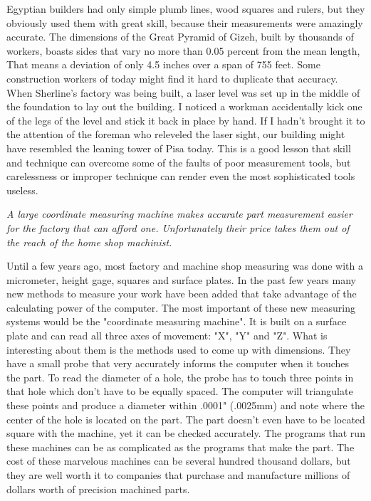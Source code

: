 Egyptian builders had only simple plumb lines, wood squares and rulers, but they
obviously used them with great skill, because their measurements were amazingly
accurate. The dimensions of the Great Pyramid of Gizeh, built by thousands of
workers, boasts sides that vary no more than 0.05 percent from the mean length,
That means a deviation of only 4.5 inches over a span of 755 feet. Some
construction workers of today might find it hard to duplicate that accuracy.
When Sherline's factory was being built, a laser level was set up in the middle
of the foundation to lay out the building. I noticed a workman accidentally kick
one of the legs of the level and stick it back in place by hand. If I hadn't
brought it to the attention of the foreman who releveled the laser sight, our
building might have resembled the leaning tower of Pisa today. This is a good
lesson that skill and technique can overcome some of the faults of poor
measurement tools, but carelessness or improper technique can render even the
most sophisticated tools useless.

\bigskip
\textit{A large coordinate measuring machine makes accurate part measurement
easier for the factory that can afford one. Unfortunately their price takes them
out of the reach of the home shop machinist.}
\bigskip


Until a few years ago, most factory and machine shop measuring was done with a
micrometer, height gage, squares and surface plates. In the past few years many
new methods to measure your work have been added that take advantage of the
calculating power of the computer. The most important of these new measuring
systems would be the "coordinate measuring machine". It is built on a surface
plate and can read all three axes of movement: "X", "Y" and "Z". What is
interesting about them is the methods used to come up with dimensions. They have
a small probe that very accurately informs the computer when it touches the
part. To read the diameter of a hole, the probe has to touch three points in
that hole which don't have to be equally spaced. The computer will triangulate
these points and produce a diameter within .0001" (.0025mm) and note where the
center of the hole is located on the part. The part doesn't even have to be
located square with the machine, yet it can be checked accurately. The programs
that run these machines can be as complicated as the programs that make the
part. The cost of these marvelous machines can be several hundred thousand
dollars, but they are well worth it to companies that purchase and manufacture
millions of dollars worth of precision machined parts.


